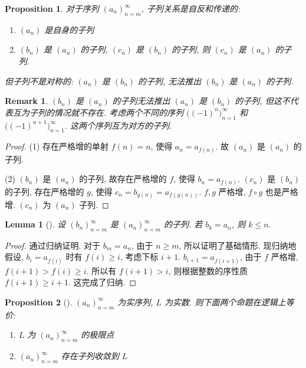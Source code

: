 \documentclass[UTF8]{ctexart}
\theoremstyle{mystyle}
\newtheorem{lemma}{Lemma}[section]
\newtheorem{proposition}{Proposition}[section]
\theoremstyle{myremark}
\newtheorem*{remark}{Remark}
\theoremstyle{plain}
\begin{document}
\begin{proposition}
    对于序列 $ (a_n)_{n = m}^\infty $, 子列关系是自反和传递的:
    \begin{enumerate}
        \item $ (a_n) $ 是自身的子列
        \item $ (b_n) $ 是 $ (a_n) $ 的子列, $ (c_n) $ 是 $ (b_n) $ 的子列, 则 $ (c_n) $ 是 $ (a_n) $ 的子列. 
    \end{enumerate}

    但子列不是对称的: $ (a_n) $ 是 $ (b_n) $ 的子列, 无法推出 $ (b_n) $ 是 $ (a_n) $ 的子列.
\end{proposition}

\begin{remark}
    $ (b_n) $ 是 $ (a_n) $ 的子列无法推出 $ (a_n) $ 是 $ (b_n) $ 的子列, 但这不代表互为子列的情况就不存在. 考虑两个不同的序列 $ \big( (-1)^{n} \big)_{n = 1}^\infty $ 和 $ \big( (-1)^{n + 1} \big)_{n = 1}^\infty $. 这两个序列互为对方的子列.
\end{remark}

\begin{proof}
    (1) 存在严格增的单射 $ f(n) = n $, 使得 $ a_n = a_{f(n)} $. 故 $ (a_n) $ 是 $ (a_n) $ 的子列.

    (2) $ (b_n) $ 是 $ (a_n) $ 的子列, 故存在严格增的 $ f $, 使得 $ b_n = a_{f(n)} $. $ (c_n) $ 是 $ (b_n) $ 的子列, 存在严格增的 $ g $, 使得 $ c_n = b_{g(n)} = a_{f ( g(n) )} $. $ f, g $ 严格增, $ f \circ g $ 也是严格增. $ (c_n) $ 为 $ (a_n) $ 子列.
\end{proof}

\begin{lemma}[]
    设 $ (b_n)_{n = m}^\infty $ 是 $ (a_n)_{n = m}^\infty $ 的子列. 若 $ b_k = a_n $, 则 $ k \leqslant n $.
\end{lemma}

\begin{proof}
    通过归纳证明. 对于 $ b_m = a_n $, 由于 $ n \geqslant m $, 所以证明了基础情形. 现归纳地假设, $ b_{i} = a_{f(i)} $ 时有 $ f(i) \geqslant i $, 考虑下标 $ i + 1 $. $ b_{i + 1} = a_{f(i + 1)} $, 由于 $ f $ 严格增, $ f(i + 1) > f(i) \geqslant i $. 所以有 $ f(i + 1) > i $, 则根据整数的序性质 $ f(i + 1) \geqslant i + 1 $. 这完成了归纳.
\end{proof}


\begin{proposition}[] \label{a}
    $ (a_n)_{n = m}^\infty $ 为实序列, $ L $ 为实数. 则下面两个命题在逻辑上等价:
    \begin{enumerate}
        \item $ L $ 为 $ (a_n)_{n = m}^\infty $ 的极限点
        \item $ (a_n)_{n = m}^\infty $ 存在子列收敛到 $ L $
    \end{enumerate}
\end{proposition}
\end{document}
